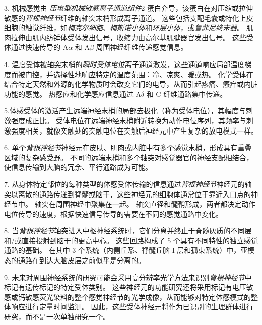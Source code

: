 3. 机械感觉由 \textit{压电型机械敏感离子通道组件}2 蛋白介导，该蛋白在对压缩或拉伸敏感的\textit{背根神经节}纤维的轴突末梢形成离子通道。
这些包括支配毛囊或特化上皮细胞的触觉纤维，如\textit{梅克尔细胞}、\textit{梅斯诺小体}和\textit{环层小体}，或\textit{鲁菲尼终末器}。
肌肉拉伸由肌内纺锤体受体发出信号，收缩力由高尔基肌腱器官发出信号。
这些受体通过快速传导的 A$\alpha$ 和 A$\beta$ 周围神经纤维传递感觉信息。


4. 温度受体被轴突末梢的\textit{瞬时受体电位}离子通道激发，这些通道响应局部温度梯度而被门控，并选择性地响应特定的温度范围：冷、凉爽、暖或热。
化学受体在结合特定天然和外源的化学物质时会改变它们的电导，从而引起疼痛、瘙痒或内脏功能的感觉。
热感应和化学感应信息通过 A$\delta$ 和 C 纤维通路集中传递。 


5.体感受体的激活产生远端神经末梢的局部去极化（称为受体电位），其幅度与刺激强度成正比。
受体电位在远端神经末梢附近转换为动作电位序列，其频率与刺激强度相关，就像突触处的突触电位在突触后神经元中产生复杂的放电模式一样。


6. 单个\textit{背根神经节}神经元在皮肤、肌肉或内脏中有多个感觉末梢，形成具有重叠区域的复杂感受野。
不同的远端末梢和多个轴突对感觉器官的神经支配相结合，使信息传输到大脑的冗余、平行通路成为可能。


7. 从身体特定部位的每种类型的体感受体传输的信息通过\textit{背根神经节}神经元的轴突以离散的通路传递到脊髓或脑干，这些神经元的细胞体通常位于靠近入口点的神经节中。
轴突在周围神经中聚集在一起。
轴突直径和髓鞘形成，两者都决定动作电位传导的速度，根据快速信号传导的需要在不同的感觉通路中变化。


8. 当\textit{背根神经节}轴突进入中枢神经系统时，它们分离并终止于脊髓灰质的不同层和/或直接投射到脑干的更高中心。
这些回路构成了 5 个具有不同特性的独立感觉通路的基础。
在其中 3 个系统（内侧丘系、脊髓丘脑 I 层和孤束系统）中，亚模态的通路在到达大脑皮层之前似乎是分离的。


9. 未来对周围神经系统的研究可能会采用高分辨率光学方法来识别\textit{背根神经节}中标记有遗传标记的特定受体类别。
这些神经元的功能研究还将采用标记有电压敏感或钙敏感荧光染料的整个感觉神经节的光学成像，从而能够对特定体感模式的整体响应进行定量时间监测。
因此，这些受体神经元将作为已识别的生理群体进行研究，而不是一次单独研究一个。


